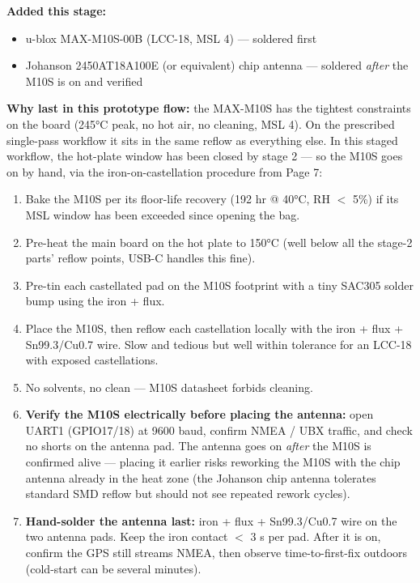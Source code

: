 \documentclass[11pt,a4paper]{article}
\begin{document}
\textbf{Added this stage:}
\begin{itemize}[nosep]
\item u-blox MAX-M10S-00B (LCC-18, MSL 4) --- soldered first
\item Johanson 2450AT18A100E (or equivalent) chip antenna --- soldered \emph{after} the M10S is on and verified
\end{itemize}

\textbf{Why last in this prototype flow:} the MAX-M10S has the tightest constraints on the board (245°C peak, no hot air, no cleaning, MSL 4). On the prescribed single-pass workflow it sits in the same reflow as everything else. In this staged workflow, the hot-plate window has been closed by stage 2 --- so the M10S goes on by hand, via the iron-on-castellation procedure from Page 7:

\begin{enumerate}[nosep]
\item Bake the M10S per its floor-life recovery (192 hr @ 40°C, RH $<$ 5\%) if its MSL window has been exceeded since opening the bag.
\item Pre-heat the main board on the hot plate to 150°C (well below all the stage-2 parts' reflow points, USB-C handles this fine).
\item Pre-tin each castellated pad on the M10S footprint with a tiny SAC305 solder bump using the iron + flux.
\item Place the M10S, then reflow each castellation locally with the iron + flux + Sn99.3/Cu0.7 wire. Slow and tedious but well within tolerance for an LCC-18 with exposed castellations.
\item No solvents, no clean --- M10S datasheet forbids cleaning.
\item \textbf{Verify the M10S electrically before placing the antenna:} open UART1 (GPIO17/18) at 9600 baud, confirm NMEA / UBX traffic, and check no shorts on the antenna pad. The antenna goes on \emph{after} the M10S is confirmed alive --- placing it earlier risks reworking the M10S with the chip antenna already in the heat zone (the Johanson chip antenna tolerates standard SMD reflow but should not see repeated rework cycles).
\item \textbf{Hand-solder the antenna last:} iron + flux + Sn99.3/Cu0.7 wire on the two antenna pads. Keep the iron contact $<$ 3 s per pad. After it is on, confirm the GPS still streams NMEA, then observe time-to-first-fix outdoors (cold-start can be several minutes).
\end{enumerate}
\end{document}
